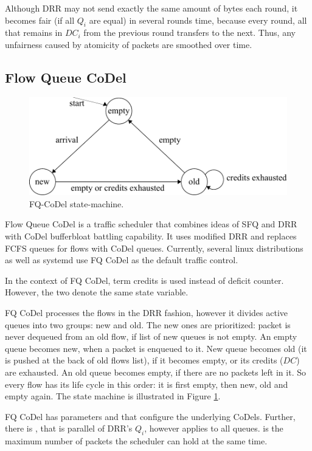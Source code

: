 Although DRR may not send exactly the same amount of bytes each round, it becomes fair (if all $Q_i$ are equal) in several rounds time, because every round, all that remains in $DC_i$ from the previous round transfers to the next. Thus, any unfairness caused by atomicity of packets are smoothed over time.

\subsection{Flow Queue CoDel}

\begin{figure}
	\centering
	\includegraphics[width=.8\linewidth]{drawings/fq_codel}
	\caption{FQ-CoDel state-machine.}
	\label{fig06:fqcodel}
\end{figure}

Flow Queue CoDel \cite{fq_codel} is a traffic scheduler that combines ideas of SFQ and DRR with CoDel bufferbloat battling capability. It uses modified DRR and replaces FCFS queues for flows with CoDel queues. Currently, several linux distributions as well as systemd use FQ CoDel as the default traffic control.

In the context of FQ CoDel, term credits is used instead of deficit counter. However, the two denote the same state variable.

FQ CoDel processes the flows in the DRR fashion, however it divides active queues into two groups: new and old. The new ones are prioritized: packet is never dequeued from an old flow, if list of new queues is not empty. An empty queue becomes new, when a packet is enqueued to it. New queue becomes old (it is pushed at the back of old flows list), if it becomes empty, or its credits ($DC$) are exhausted. An old queue becomes empty, if there are no packets left in it. So every flow has its life cycle in this order: it is first empty, then new, old and empty again. The state machine is illustrated in Figure \ref{fig06:fqcodel}.

FQ CoDel has parameters  and  that configure the underlying CoDels. Further, there is , that is parallel of DRR's $Q_i$, however  applies to all queues.  is the maximum number of packets the scheduler can hold at the same time.

